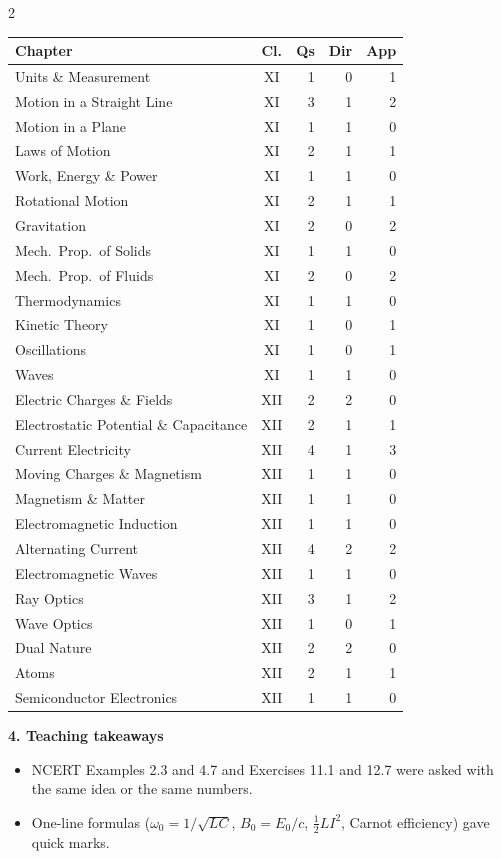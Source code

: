 \begin{multicols}{2}
{\begin{tabular}{@{}p{4.7cm}c@{\,}r@{\,}r@{\,}r@{}}
Chapter & Cl. & Qs & Dir & App\\\midrule
Units \& Measurement & XI & 1 & 0 & 1\\
Motion in a Straight Line & XI & 3 & 1 & 2\\
Motion in a Plane & XI & 1 & 1 & 0\\
Laws of Motion & XI & 2 & 1 & 1\\
Work, Energy \& Power & XI & 1 & 1 & 0\\
Rotational Motion & XI & 2 & 1 & 1\\
Gravitation & XI & 2 & 0 & 2\\
Mech.\ Prop.\ of Solids & XI & 1 & 1 & 0\\
Mech.\ Prop.\ of Fluids & XI & 2 & 0 & 2\\
Thermodynamics & XI & 1 & 1 & 0\\
Kinetic Theory & XI & 1 & 0 & 1\\
Oscillations & XI & 1 & 0 & 1\\
Waves & XI & 1 & 1 & 0\\
Electric Charges \& Fields & XII & 2 & 2 & 0\\
Electrostatic Potential \& Capacitance & XII & 2 & 1 & 1\\
Current Electricity & XII & 4 & 1 & 3\\
Moving Charges \& Magnetism & XII & 1 & 1 & 0\\
Magnetism \& Matter & XII & 1 & 1 & 0\\
Electromagnetic Induction & XII & 1 & 1 & 0\\
Alternating Current & XII & 4 & 2 & 2\\
Electromagnetic Waves & XII & 1 & 1 & 0\\
Ray Optics & XII & 3 & 1 & 2\\
Wave Optics & XII & 1 & 0 & 1\\
Dual Nature & XII & 2 & 2 & 0\\
Atoms & XII & 2 & 1 & 1\\
Semiconductor Electronics & XII & 1 & 1 & 0\\
\bottomrule\end{tabular}}\par\medskip
\textbf{\color{crimson}4. Teaching takeaways}\par\smallskip
{\footnotesize\begin{itemize}[leftmargin=1em,nosep]
\item NCERT Examples 2.3 and 4.7 and Exercises 11.1 and 12.7 were asked with the same idea or the same numbers.
\item One-line formulas ($\omega_0=1/\sqrt{LC}$, $B_0=E_0/c$, $\tfrac12LI^2$, Carnot efficiency) gave quick marks.

\end{itemize}}
\end{multicols}
